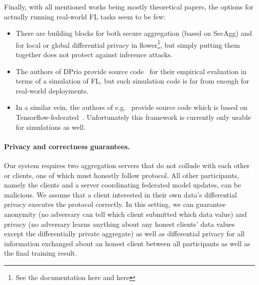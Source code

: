 \documentclass{article}
\begin{document}
Finally, with all mentioned works being mostly theoretical papers, the
options for actually running real-world FL tasks seem to be few:
\begin{itemize}
  \setlength\itemsep{0em}
\item There are building blocks for both secure aggregation (based on SecAgg) and for local or
  global differential privacy in flower\footnote{See the documentation here and
    here}, but simply putting them together does not protect against inference
  attacks.
\item The authors of DPrio provide source code~\cite{} for their empirical evaluation in
  terms of a simulation of FL, but such simulation code is far from enough for
  real-world deployments.
\item In a similar vein, the authors of e.g.~\cite{Kairouz2021TheDD} provide
  source code which is based on Tensorflow-federated~\cite{}. Unfortunately this
  framework is currently only usable for simulations as well.
\end{itemize}




\paragraph{Privacy and correctness guarantees.}
Our system requires two aggregation servers that do not collude with each other or clients, one of which must honestly follow protocol. All other participants, namely the clients and a server coordinating federated model updates, can be malicious. We assume that a client interested in their own data's differential privacy executes the protocol correctly. In this setting, we can guarantee anonymity (no adversary can tell which client submitted which data value) and privacy (no adversary learns anything about any honest clients' data values except the differentially private aggregate) as well as differential privacy for all information exchanged about an honest client between all participants as well as the final training result.
\end{document}
